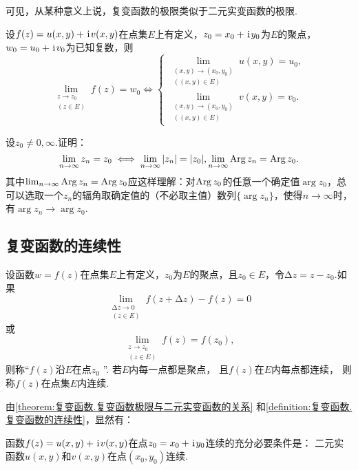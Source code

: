 可见，从某种意义上说，复变函数的极限类似于二元实变函数的极限.
\begin{theorem}\label{theorem:复变函数.复变函数极限与二元实变函数的关系}
设\(f(z)=u(x,y)+\kern1pt\mathrm{i}\kern1pt v(x,y)\)在点集\(E\)上有定义，\(z_0=x_0+\kern1pt\mathrm{i}\kern1pt y_0\)为\(E\)的聚点，\(w_0=u_0+\kern1pt\mathrm{i}\kern1pt v_0\)为已知复数，则\[
\lim_{\substack{z \to z_0 \\ (z \in E)}} f(z) = w_0
\iff
\left\{ \begin{array}{l}
\lim_{\substack{(x,y)\to(x_0,y_0) \\ ((x,y) \in E)}} u(x,y) = u_0, \\
\lim_{\substack{(x,y)\to(x_0,y_0) \\ ((x,y) \in E)}} v(x,y) = v_0.
\end{array} \right.
\]
\end{theorem}

\begin{example}
设\(z_0\neq0,\infty\).证明：\[
\lim_{n\to\infty} z_n = z_0
\iff
\lim_{n\to\infty} \abs{z_n} = \abs{z_0},
\lim_{n\to\infty} \operatorname{Arg} z_n = \operatorname{Arg} z_0.
\]其中\(\lim_{n\to\infty} \operatorname{Arg} z_n = \operatorname{Arg} z_0\)应这样理解：对\(\operatorname{Arg} z_0\)的任意一个确定值\(\arg z_0\)，总可以选取一个\(z_n\)的辐角取确定值的（不必取主值）数列\(\{ \arg z_n \}\)，使得\(n\to\infty\)时，有\(\arg z_n \to \arg z_0\).
\end{example}

\subsection{复变函数的连续性}
\begin{definition}\label{definition:复变函数.复变函数的连续性}
设函数\(w=f(z)\)在点集\(E\)上有定义，\(z_0\)为\(E\)的聚点，且\(z_0 \in E\)，令\(\increment z = z - z_0\).如果\[
\lim_{\substack{\increment z\to0 \\ (z \in E)}} f(z+\increment z) - f(z) = 0
\]或\[
\lim_{\substack{z \to z_0 \\ (z \in E)}} f(z) = f(z_0),
\]
则称“\(f(z)\)沿\(E\)在点\(z_0\) ”.
若\(E\)内每一点都是聚点，
且\(f(z)\)在\(E\)内每点都连续，
则称\(f(z)\)在点集\(E\)内连续.
\end{definition}

由\cref{theorem:复变函数.复变函数极限与二元实变函数的关系} 和\cref{definition:复变函数.复变函数的连续性}，显然有：
\begin{theorem}
函数\(f(z)=u(x,y)+\kern1pt\mathrm{i}\kern1pt v(x,y)\)在点\(z_0=x_0+\kern1pt\mathrm{i}\kern1pt y_0\)连续的充分必要条件是：
二元实函数\(u(x,y)\)和\(v(x,y)\)在点\((x_0,y_0)\)连续.
\end{theorem}

